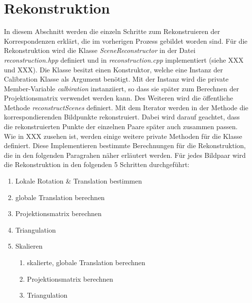\section{Rekonstruktion}

In diesem Abschnitt werden die einzeln Schritte zum Rekonstruieren der Korrespondenzen erklärt, die im vorherigen Prozess gebildet worden sind. 
Für die Rekonstruktion wird die Klasse \emph{SceneReconstructor} in der Datei \emph{reconstruction.hpp} definiert und in \emph{reconstruction.cpp} implementiert (siehe XXX und XXX). 
Die Klasse besitzt einen Konstruktor, welche eine Instanz der Calibration Klasse als Argument benötigt. 
Mit der Instanz wird die private Member-Variable \emph{calbiration} instanziiert, so dass sie später zum Berechnen der Projektionsmatrix verwendet werden kann.
Des Weiteren wird die öffentliche Methode \emph{reconstructScenes} definiert.
Mit dem Iterator werden in der Methode die korrespondierenden Bildpunkte rekonstruiert.
Dabei wird darauf geachtet, dass die rekonstruierten Punkte der einzelnen Paare später auch zusammen passen.
Wie in XXX zusehen ist, werden einige weitere private Methoden für die Klasse definiert.
Diese Implementieren bestimmte Berechnungen für die Rekonstruktion, die in den folgenden Paragrahen näher erläutert werden.
Für jedes Bildpaar wird die Rekonstruktion in den folgenden 5 Schritten durchgeführt:

\begin{enumerate}
    \item Lokale Rotation \& Translation bestimmen
    \item globale Translation berechnen
    \item Projektionsmatrix berechnen
    \item Triangulation
    \item Skalieren
        \begin{enumerate}
            \item skalierte, globale Translation berechnen
            \item Projektionsmatrix berechnen
            \item Triangulation
        \end{enumerate}
\end{enumerate}

